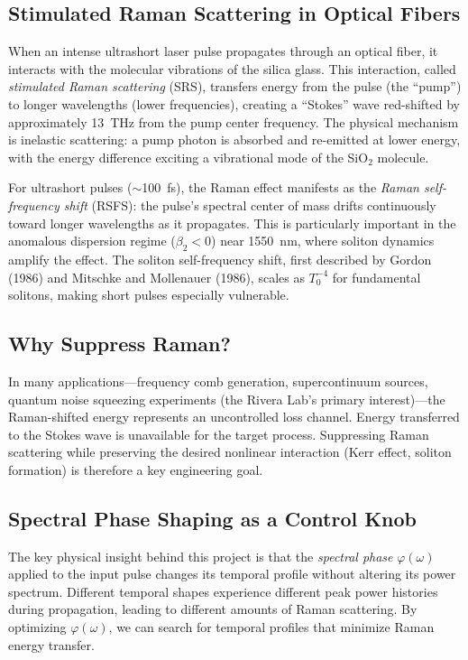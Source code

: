 \documentclass[12pt,a4paper]{article}
\theoremstyle{definition}
\begin{document}
\subsection{Stimulated Raman Scattering in Optical Fibers}

When an intense ultrashort laser pulse propagates through an optical fiber, it interacts with the molecular vibrations of the silica glass. This interaction, called \emph{stimulated Raman scattering} (SRS), transfers energy from the pulse (the ``pump'') to longer wavelengths (lower frequencies), creating a ``Stokes'' wave red-shifted by approximately 13~THz from the pump center frequency. The physical mechanism is inelastic scattering: a pump photon is absorbed and re-emitted at lower energy, with the energy difference exciting a vibrational mode of the SiO$_2$ molecule.

For ultrashort pulses ($\sim$100~fs), the Raman effect manifests as the \emph{Raman self-frequency shift} (RSFS): the pulse's spectral center of mass drifts continuously toward longer wavelengths as it propagates. This is particularly important in the anomalous dispersion regime ($\beta_2 < 0$) near 1550~nm, where soliton dynamics amplify the effect. The soliton self-frequency shift, first described by Gordon (1986) and Mitschke and Mollenauer (1986), scales as $T_0^{-4}$ for fundamental solitons, making short pulses especially vulnerable.

\subsection{Why Suppress Raman?}

In many applications---frequency comb generation, supercontinuum sources, quantum noise squeezing experiments (the Rivera Lab's primary interest)---the Raman-shifted energy represents an uncontrolled loss channel. Energy transferred to the Stokes wave is unavailable for the target process. Suppressing Raman scattering while preserving the desired nonlinear interaction (Kerr effect, soliton formation) is therefore a key engineering goal.

\subsection{Spectral Phase Shaping as a Control Knob}

The key physical insight behind this project is that the \emph{spectral phase} $\varphi(\omega)$ applied to the input pulse changes its temporal profile without altering its power spectrum. Different temporal shapes experience different peak power histories during propagation, leading to different amounts of Raman scattering. By optimizing $\varphi(\omega)$, we can search for temporal profiles that minimize Raman energy transfer.
\end{document}
